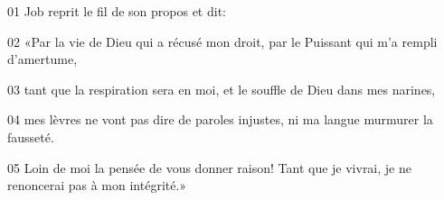 01 Job reprit le fil de son propos et dit:

02 «Par la vie de Dieu qui a récusé mon droit, par le Puissant qui m’a rempli d’amertume,

03 tant que la respiration sera en moi, et le souffle de Dieu dans mes narines,

04 mes lèvres ne vont pas dire de paroles injustes, ni ma langue murmurer la fausseté.

05 Loin de moi la pensée de vous donner raison! Tant que je vivrai, je ne renoncerai pas à mon intégrité.»
